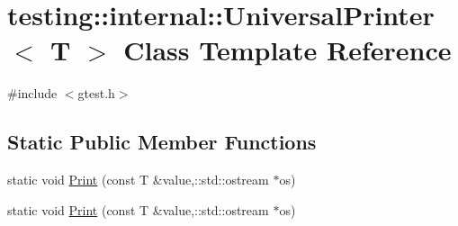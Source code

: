 \hypertarget{classtesting_1_1internal_1_1_universal_printer}{\section{testing\-:\-:internal\-:\-:Universal\-Printer$<$ T $>$ Class Template Reference}
\label{classtesting_1_1internal_1_1_universal_printer}
}


{\ttfamily \#include $<$gtest.\-h$>$}

\subsection*{Static Public Member Functions}
\begin{DoxyCompactItemize}
\item 
static void \hyperlink{classtesting_1_1internal_1_1_universal_printer_a6a7d29444412467c14931bc55a046138}{Print} (const T \&value,\-::std\-::ostream $\ast$os)
\item 
static void \hyperlink{classtesting_1_1internal_1_1_universal_printer_a6a7d29444412467c14931bc55a046138}{Print} (const T \&value,\-::std\-::ostream $\ast$os)
\end{DoxyCompactItemize}


